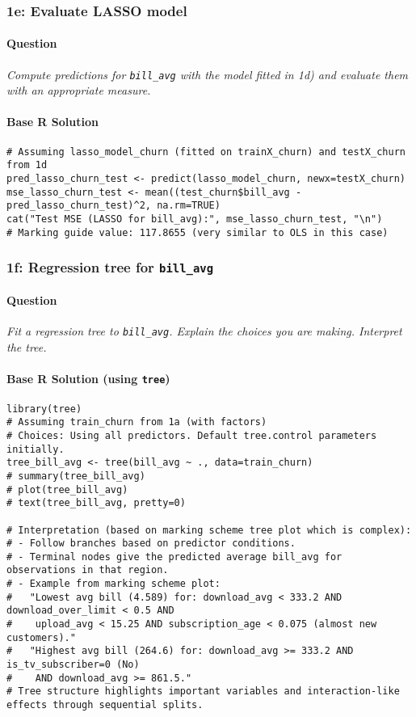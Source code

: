 \documentclass[12pt,a4paper]{article}
\newcommand{\Rpackage}[1]{\texttt{#1}} %
\newcommand{\Rcode}[1]{\texttt{#1}} %
\begin{document}
    \subsubsection{1e: Evaluate LASSO model}
        \paragraph{Question}
        \textit{Compute predictions for \Rcode{bill\_avg} with the model fitted in 1d) and evaluate them with an appropriate measure.}
        \paragraph{Base R Solution}
\begin{lstlisting}
# Assuming lasso_model_churn (fitted on trainX_churn) and testX_churn from 1d
pred_lasso_churn_test <- predict(lasso_model_churn, newx=testX_churn)
mse_lasso_churn_test <- mean((test_churn$bill_avg - pred_lasso_churn_test)^2, na.rm=TRUE)
cat("Test MSE (LASSO for bill_avg):", mse_lasso_churn_test, "\n")
# Marking guide value: 117.8655 (very similar to OLS in this case)
\end{lstlisting}

    \subsubsection{1f: Regression tree for \Rcode{bill\_avg}}
        \paragraph{Question}
        \textit{Fit a regression tree to \Rcode{bill\_avg}. Explain the choices you are making. Interpret the tree.}
        \paragraph{Base R Solution (using \Rpackage{tree})}
\begin{lstlisting}
library(tree)
# Assuming train_churn from 1a (with factors)
# Choices: Using all predictors. Default tree.control parameters initially.
tree_bill_avg <- tree(bill_avg ~ ., data=train_churn)
# summary(tree_bill_avg)
# plot(tree_bill_avg)
# text(tree_bill_avg, pretty=0)

# Interpretation (based on marking scheme tree plot which is complex):
# - Follow branches based on predictor conditions.
# - Terminal nodes give the predicted average bill_avg for observations in that region.
# - Example from marking scheme plot:
#   "Lowest avg bill (4.589) for: download_avg < 333.2 AND download_over_limit < 0.5 AND 
#    upload_avg < 15.25 AND subscription_age < 0.075 (almost new customers)."
#   "Highest avg bill (264.6) for: download_avg >= 333.2 AND is_tv_subscriber=0 (No)
#    AND download_avg >= 861.5."
# Tree structure highlights important variables and interaction-like effects through sequential splits.
\end{lstlisting}
\end{document}
